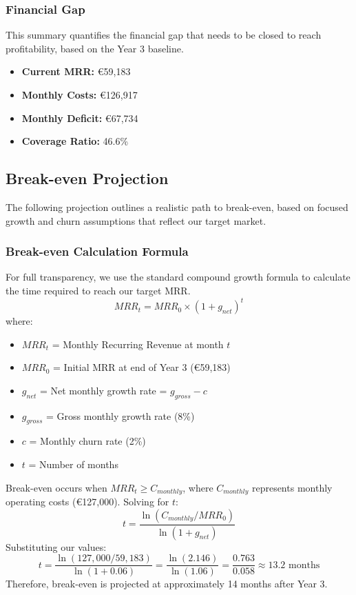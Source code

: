 \documentclass[11pt, a4paper, oneside]{article}
\begin{document}
\subsubsection{Financial Gap}
This summary quantifies the financial gap that needs to be closed to reach profitability, based on the Year 3 baseline.
\begin{itemize}
    \item \textbf{Current MRR:} \euro{59,183}
    \item \textbf{Monthly Costs:} \euro{126,917}
    \item \textbf{Monthly Deficit:} \euro{67,734}
    \item \textbf{Coverage Ratio:} 46.6\%
\end{itemize}

\subsection{Break-even Projection}
The following projection outlines a realistic path to break-even, based on focused growth and churn assumptions that reflect our target market.

\subsubsection{Break-even Calculation Formula}
For full transparency, we use the standard compound growth formula to calculate the time required to reach our target MRR.
\begin{equation}
    MRR_{t} = MRR_{0} \times (1 + g_{net})^{t}
\end{equation}
where:
\begin{itemize}
    \item $MRR_{t}$ = Monthly Recurring Revenue at month $t$
    \item $MRR_{0}$ = Initial MRR at end of Year 3 (\euro{59,183})
    \item $g_{net}$ = Net monthly growth rate = $g_{gross} - c$
    \item $g_{gross}$ = Gross monthly growth rate (8\%)
    \item $c$ = Monthly churn rate (2\%)
    \item $t$ = Number of months
\end{itemize}
Break-even occurs when $MRR_{t} \geq C_{monthly}$, where $C_{monthly}$ represents monthly operating costs (\euro{127,000}).
\newline\newline
Solving for $t$:
\begin{equation}
    t = \frac{\ln(C_{monthly} / MRR_{0})}{\ln(1 + g_{net})}
\end{equation}
\newline
Substituting our values:
\begin{equation}
    t = \frac{\ln(127,000 / 59,183)}{\ln(1 + 0.06)} = \frac{\ln(2.146)}{\ln(1.06)} = \frac{0.763}{0.058} \approx 13.2 \text{ months}
\end{equation}
Therefore, break-even is projected at approximately 14 months after Year 3.
\end{document}
